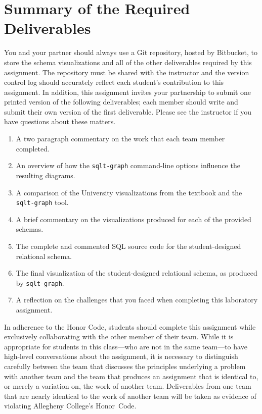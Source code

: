 \section*{Summary of the Required Deliverables}

You and your partner should always use a Git repository, hosted by Bitbucket, to store the schema visualizations and
all of the other deliverables required by this assignment. The repository must be shared with the instructor and
the version control log should accurately reflect each student's contribution to this assignment. In addition, this
assignment invites your partnership to submit one printed version of the following deliverables; each member should
write and submit their own version of the first deliverable. Please see the instructor if you have questions about
these matters.


\begin{enumerate}
  \setlength{\itemsep}{0pt}
  \item A two paragraph commentary on the work that each team member completed. 
  \item An overview of how the {\tt sqlt-graph} command-line options influence the resulting diagrams.
  \item A comparison of the University visualizations from the textbook and the {\tt sqlt-graph} tool.
  \item A brief commentary on the visualizations produced for each of the provided schemas.
  \item The complete and commented SQL source code for the student-designed relational schema.
  \item The final visualization of the student-designed relational schema, as produced by {\tt sqlt-graph}.
  \item A reflection on the challenges that you faced when completing this laboratory assignment.
\end{enumerate}


In adherence to the Honor Code, students should complete this assignment while exclusively collaborating with the
other member of their team. While it is appropriate for students in this class---who are not in the same team---to have
high-level conversations about the assignment, it is necessary to distinguish carefully between the team that discusses
the principles underlying a problem with another team and the team that produces an assignment that is identical to, or
merely a variation on, the work of another team.  Deliverables from one team that are nearly identical to the work of
another team will be taken as evidence of violating Allegheny College's \mbox{Honor Code}.



